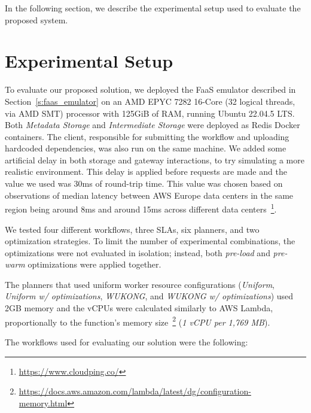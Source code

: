 In the following section, we describe the experimental setup used to evaluate the proposed system.

\section{Experimental Setup}

To evaluate our proposed solution, we deployed the FaaS emulator described in Section~\ref{s:faas_emulator} on an AMD EPYC 7282 16-Core (32 logical threads, via AMD SMT) processor with 125GiB of RAM, running Ubuntu 22.04.5 LTS. Both \textit{Metadata Storage} and \textit{Intermediate Storage} were deployed as Redis Docker containers. The client, responsible for submitting the workflow and uploading hardcoded dependencies, was also run on the same machine. We added some artificial delay in both storage and gateway interactions, to try simulating a more realistic environment. This delay is applied before requests are made and the value we used was 30ms of round-trip time. This value was chosen based on observations of median latency between AWS Europe data centers in the same region being around 8ms and around 15ms across different data centers~\footnote{\url{https://www.cloudping.co/}}.

We tested four different workflows, three SLAs, six planners, and two optimization strategies. To limit the number of experimental combinations, the optimizations were not evaluated in isolation; instead, both \textit{pre-load} and \textit{pre-warm} optimizations were applied together. 

The planners that used uniform worker resource configurations (\textit{Uniform}, \textit{Uniform w/ optimizations}, \textit{WUKONG}, and \textit{WUKONG w/ optimizations}) used 2GB memory and the vCPUs were calculated similarly to AWS Lambda, proportionally to the function's memory size~\footnote{\url{https://docs.aws.amazon.com/lambda/latest/dg/configuration-memory.html}} (\textit{1 vCPU per 1,769 MB}).

The workflows used for evaluating our solution were the following:

